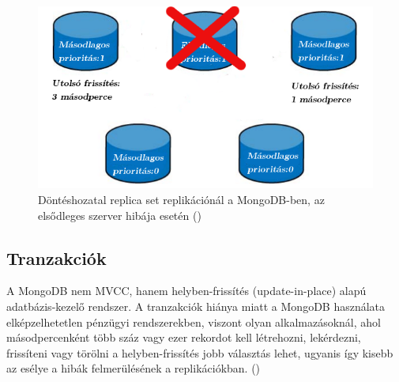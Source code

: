 			
			\begin{figure}[ht]
				\centering
					\includegraphics[scale=0.5]{pictures/mongodb_repl_set_failover.png}%
					\caption[DUMMY]%
					{Döntéshozatal replica set replikációnál a MongoDB-ben, az elsődleges szerver hibája esetén (\cite{scaling_mongodb_repl_set_failover})}
					\label{fig:mongodb_repl_set_failover}
			\end{figure}
	\subsection{Tranzakciók}
		A MongoDB nem MVCC, hanem helyben-frissítés (update-in-place) alapú adatbázis-kezelő rendszer. A tranzakciók hiánya miatt a MongoDB használata elképzelhetetlen pénzügyi rendszerekben, viszont olyan alkalmazásoknál, ahol másodpercenként több száz vagy ezer rekordot kell létrehozni, lekérdezni, frissíteni vagy törölni a helyben-frissítés jobb választás lehet, ugyanis így kisebb az esélye a hibák felmerülésének a replikációkban. ()
